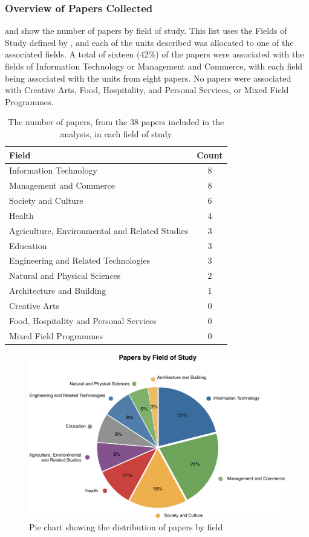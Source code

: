 \clearpage
\subsubsection{Overview of Papers Collected} %
\label{sub:overview_of_papers_collected}

 and  show the number of papers by field of study. This list uses the Fields of Study defined by \citet{Trewin:2000}, and each of the units described was allocated to one of the associated fields. A total of sixteen (42\%) of the papers were associated with the fields of Information Technology or Management and Commerce, with each field being associated with the units from eight papers. No papers were associated with Creative Arts, Food, Hospitality, and Personal Services, or Mixed Field Programmes.

\begin{table}[p]
	\centering
	\caption{The number of papers, from the 38 papers included in the analysis, in each field of study}
	\label{tbl:degrees}
	\footnotesize
    \begin{tabular}{lc}
    \textbf{Field} & \textbf{Count} \\ \hline
    Information Technology & 8 \\
	Management and Commerce &	8 \\
	Society and Culture &	6 \\
	Health &	4 \\
	Agriculture, Environmental and Related Studies &	3 \\
	Education &	3 \\
	Engineering and Related Technologies &	3 \\
	Natural and Physical Sciences &	2 \\
	Architecture and Building &	1 \\
	Creative Arts &	0 \\
	Food, Hospitality and Personal Services &	0 \\
	Mixed Field Programmes &	0 \\
    \end{tabular}
\end{table}

\begin{figure}[p]
	\centering
	\includegraphics[width=\textwidth]{Degrees}
	\caption{Pie chart showing the distribution of papers by field}
	\label{fig:degree_dist}
\end{figure}

